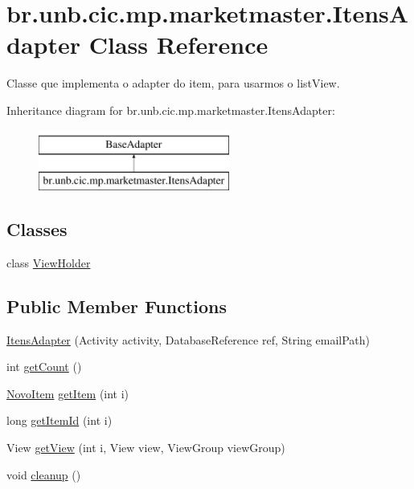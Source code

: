 \hypertarget{classbr_1_1unb_1_1cic_1_1mp_1_1marketmaster_1_1ItensAdapter}{}\section{br.\+unb.\+cic.\+mp.\+marketmaster.\+Itens\+Adapter Class Reference}
\label{classbr_1_1unb_1_1cic_1_1mp_1_1marketmaster_1_1ItensAdapter}


Classe que implementa o adapter do item, para usarmos o list\+View.  


Inheritance diagram for br.\+unb.\+cic.\+mp.\+marketmaster.\+Itens\+Adapter\+:\begin{figure}[H]
\begin{center}
\leavevmode
\includegraphics[height=2.000000cm]{classbr_1_1unb_1_1cic_1_1mp_1_1marketmaster_1_1ItensAdapter}
\end{center}
\end{figure}
\subsection*{Classes}
\begin{DoxyCompactItemize}
\item 
class \mbox{\hyperlink{classbr_1_1unb_1_1cic_1_1mp_1_1marketmaster_1_1ItensAdapter_1_1ViewHolder}{View\+Holder}}
\end{DoxyCompactItemize}
\subsection*{Public Member Functions}
\begin{DoxyCompactItemize}
\item 
\mbox{\hyperlink{classbr_1_1unb_1_1cic_1_1mp_1_1marketmaster_1_1ItensAdapter_aec9acb282d404c0b9a153118a4d8c66f}{Itens\+Adapter}} (Activity activity, Database\+Reference ref, String email\+Path)
\item 
int \mbox{\hyperlink{classbr_1_1unb_1_1cic_1_1mp_1_1marketmaster_1_1ItensAdapter_a71ac0bba3768d3f467195db20998d65e}{get\+Count}} ()
\item 
\mbox{\hyperlink{classbr_1_1unb_1_1cic_1_1mp_1_1marketmaster_1_1NovoItem}{Novo\+Item}} \mbox{\hyperlink{classbr_1_1unb_1_1cic_1_1mp_1_1marketmaster_1_1ItensAdapter_a4e1cabae519caaa1296aeb302a035e6f}{get\+Item}} (int i)
\item 
long \mbox{\hyperlink{classbr_1_1unb_1_1cic_1_1mp_1_1marketmaster_1_1ItensAdapter_af8284bc4a4f2ce9cd396295c8ffaa738}{get\+Item\+Id}} (int i)
\item 
View \mbox{\hyperlink{classbr_1_1unb_1_1cic_1_1mp_1_1marketmaster_1_1ItensAdapter_a5f578daa2e403e26ca10f5410656f1d5}{get\+View}} (int i, View view, View\+Group view\+Group)
\item 
void \mbox{\hyperlink{classbr_1_1unb_1_1cic_1_1mp_1_1marketmaster_1_1ItensAdapter_a7e62d55f972d57a2909635e9b3a20c8d}{cleanup}} ()
\end{DoxyCompactItemize}

